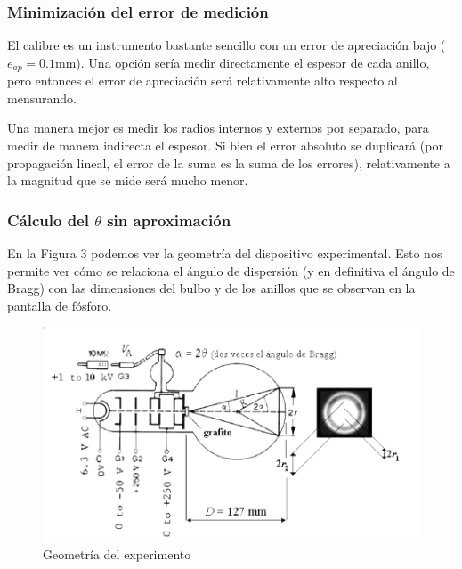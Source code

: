 \documentclass[]{article}
\begin{document}
\hypertarget{minimizaciuxf3n-del-error-de-mediciuxf3n}{%
\subsubsection{Minimización del error de
medición}\label{minimizaciuxf3n-del-error-de-mediciuxf3n}}

El calibre es un instrumento bastante sencillo con un error de
apreciación bajo (\(e_{ap} = 0.1\mathrm{mm}\)). Una opción sería medir
directamente el espesor de cada anillo, pero entonces el error de
apreciación será relativamente alto respecto al mensurando.

Una manera mejor es medir los radios internos y externos por separado,
para medir de manera indirecta el espesor. Si bien el error absoluto se
duplicará (por propagación lineal, el error de la suma es la suma de los
errores), relativamente a la magnitud que se mide será mucho menor.

\hypertarget{cuxe1lculo-del-theta-sin-aproximaciuxf3n}{%
\subsubsection{\texorpdfstring{Cálculo del \(\theta\) sin
aproximación}{Cálculo del \textbackslash{}theta sin aproximación}}\label{cuxe1lculo-del-theta-sin-aproximaciuxf3n}}

En la Figura 3 podemos ver la geometría del dispositivo experimental.
Esto nos permite ver cómo se relaciona el ángulo de dispersión (y en
definitiva el ángulo de Bragg) con las dimensiones del bulbo y de los
anillos que se observan en la pantalla de fósforo.

\begin{figure}[H]
\centering
\includegraphics{geometria_experimento.png}
\caption{Geometría del experimento}
\end{figure}
\end{document}
